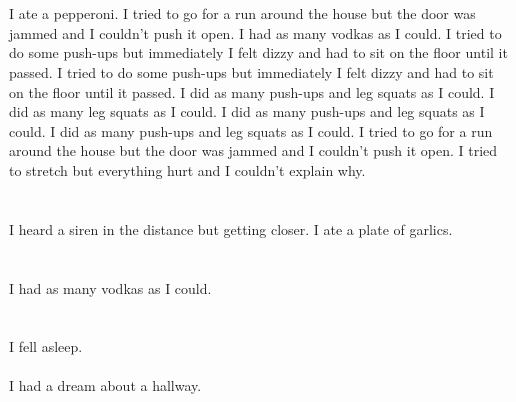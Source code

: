 \documentclass{article}
\begin{document}
    \section{}
    I ate a pepperoni. I tried to go for a run around the house but the door was jammed and I couldn't push it open. I had as many vodkas as I could.  I tried to do some push-ups but immediately I felt dizzy and had to sit on the floor until it passed.  I tried to do some push-ups but immediately I felt dizzy and had to sit on the floor until it passed.  I did as many push-ups and leg squats as I could.  I did as many leg squats as I could.   I did as many push-ups and leg squats as I could.  I did as many push-ups and leg squats as I could.  I tried to go for a run around the house but the door was jammed and I couldn't push it open.  I tried to stretch but everything hurt and I couldn't explain why.  
    \newpage
    
    \section{}
    I heard a siren in the distance but getting closer. I ate a plate of garlics.  
    \newpage
    
    \section{}
    I had as many vodkas as I could.  
    \newpage
    
    \section{}
    I fell asleep.\\\\I had a dream about a hallway.\\\\ 
    \newpage
    
\end{document}
